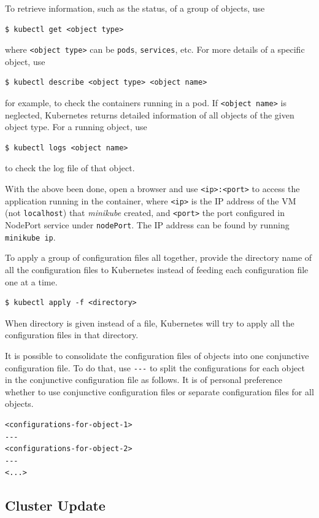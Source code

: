 To retrieve information, such as the status, of a group of objects, use
\begin{lstlisting}
$ kubectl get <object type>
\end{lstlisting}
where \verb|<object type>| can be \verb|pods|, \verb|services|, etc. For more details of a specific object, use
\begin{lstlisting}
$ kubectl describe <object type> <object name>
\end{lstlisting}
for example, to check the containers running in a pod. If \verb|<object name>| is neglected, Kubernetes returns detailed information of all objects of the given object type. For a running object, use
\begin{lstlisting}
$ kubectl logs <object name>
\end{lstlisting}
to check the log file of that object.

With the above been done, open a browser and use \verb|<ip>:<port>| to access the application running in the container, where \verb|<ip>| is the IP address of the VM (not \verb|localhost|) that \textit{minikube} created, and \verb|<port>| the port configured in NodePort service under \verb|nodePort|. The IP address can be found by running \verb|minikube ip|.

To apply a group of configuration files all together, provide the directory name of all the configuration files to Kubernetes instead of feeding each configuration file one at a time.
\begin{lstlisting}
$ kubectl apply -f <directory>
\end{lstlisting}
When directory is given instead of a file, Kubernetes will try to apply all the configuration files in that directory.

It is possible to consolidate the configuration files of objects into one conjunctive configuration file. To do that, use \verb|---| to split the configurations for each object in the conjunctive configuration file as follows. It is of personal preference whether to use conjunctive configuration files or separate configuration files for all objects.
\begin{lstlisting}
<configurations-for-object-1>
---
<configurations-for-object-2>
---
<...>
\end{lstlisting}

\subsection{Cluster Update} \label{ch:vac:subsec:updatek8s}

